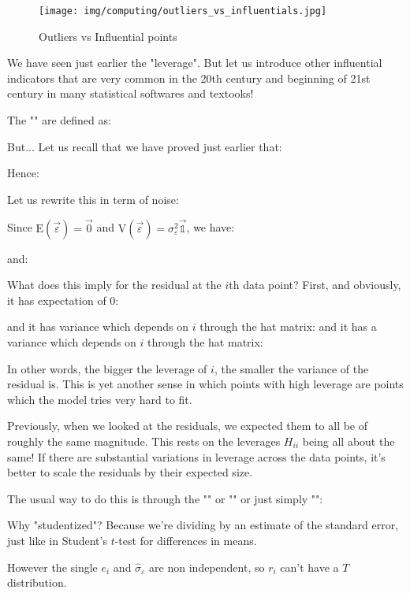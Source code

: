 	\begin{figure}[H]
		\centering
		\texttt{[image: img/computing/outliers\_vs\_influentials.jpg]}
		\caption{Outliers vs Influential points}
	\end{figure}
	
	We have seen just earlier the "leverage". But let us introduce other influential indicators that are very common in the 20th century and beginning of 21st century in many statistical softwares and textooks!
	
	The "" are defined as:
	
	But... Let us recall that we have proved just earlier that:
	
	Hence:
	
	Let us rewrite this in term of noise:
	
	Since $\text{E}(\vec{\varepsilon})=\vec{0}$ and $\text{V}(\vec{\varepsilon})=\sigma^2_\varepsilon\vec{\mathds{1}}$, we have:
	
	and:
	
	What does this imply for the residual at the $i$th data point? First, and obviously, it has expectation of $0$:
	
	and it has variance which depends on $i$ through the hat matrix:
	and it has a variance which depends on $i$ through the hat matrix:
	
	In other words, the bigger the leverage of $i$, the smaller the variance of the residual is. This is yet another sense in which points with high leverage are points which the model tries very hard to fit.
	
	Previously, when we looked at the residuals, we expected them to all be of roughly the same magnitude. This rests on the leverages $H_{ii}$ being all about the same! If there are substantial variations in leverage across the data points, it's better to scale the residuals by their expected size.

	The usual way to do this is through the "" or "" or just simply "":
	
	Why "studentized"? Because we're dividing by an estimate of the standard error, just like in Student's $t$-test for differences in means.
	
	However the single $e_i$ and $\hat{\sigma}_\varepsilon$ are non independent, so $r_i$ can't have a $T$ distribution.
	
